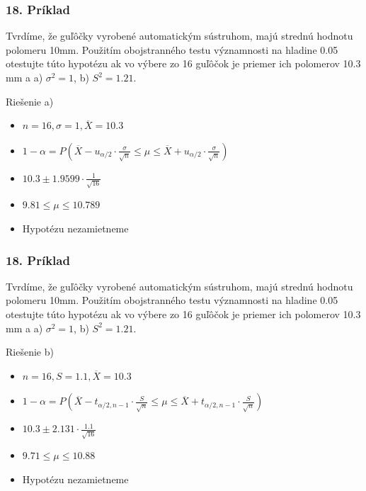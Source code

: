 \documentclass{beamer}
\begin{document}
\begin{frame}
\frametitle{18. Príklad}

Tvrdíme, že guľôčky vyrobené automatickým sústruhom, majú strednú hodnotu polomeru 10mm. Použitím obojstranného testu významnosti na hladine 0.05 otestujte túto hypotézu ak vo výbere zo 16 guľôčok je priemer ich polomerov 10.3 mm a a) $\sigma^2 = 1$, b) $S^2 = 1.21$. 

Riešenie a)
\begin{itemize}
\item<2-> $n =16, \sigma = 1, \overline{X} = 10.3$
\item<3-> $1 - \alpha = P(\overline{X} - u_{\alpha/2} \cdot \frac{\sigma}{\sqrt{n}} \leq \mu \leq \overline{X} + u_{\alpha/2} \cdot \frac{\sigma}{\sqrt{n}})$
\item<4-> $10.3 \pm 1.9599 \cdot \frac{1}{\sqrt{16}}$
\item<5-> $9.81 \leq \mu \leq 10.789$
\item<5-> Hypotézu nezamietneme
\end{itemize}
\end{frame}

\begin{frame}
\frametitle{18. Príklad}

Tvrdíme, že guľôčky vyrobené automatickým sústruhom, majú strednú hodnotu polomeru 10mm. Použitím obojstranného testu významnosti na hladine 0.05 otestujte túto hypotézu ak vo výbere zo 16 guľôčok je priemer ich polomerov 10.3 mm a a) $\sigma^2 = 1$, b) $S^2 = 1.21$. 

Riešenie b)
\begin{itemize}
\item<2-> $n =16, S = 1.1, \overline{X} = 10.3$
\item<3-> $1 - \alpha = P(\overline{X} - t_{\alpha/2, n-1} \cdot \frac{S}{\sqrt{n}} \leq \mu \leq \overline{X} + t_{\alpha/2, n-1} \cdot \frac{S}{\sqrt{n}})$
\item<4-> $10.3 \pm 2.131 \cdot \frac{1.1}{\sqrt{16}}$
\item<5-> $9.71 \leq \mu \leq 10.88$
\item<5-> Hypotézu nezamietneme
\end{itemize}
\end{frame}
\end{document}
